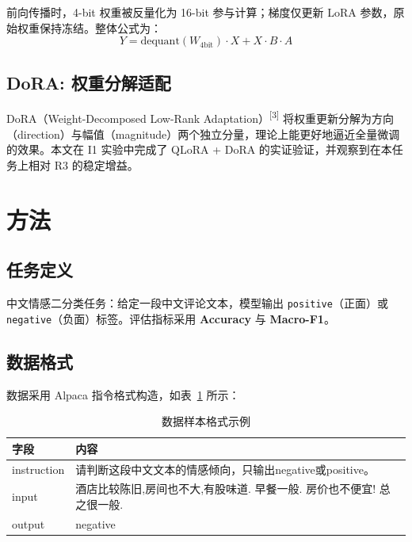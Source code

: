 \documentclass[12pt,a4paper]{article}
\begin{document}
前向传播时，4-bit 权重被反量化为 16-bit 参与计算；梯度仅更新 LoRA 参数，原始权重保持冻结。整体公式为：
\begin{equation}
  Y = \text{dequant}(W_{\text{4bit}}) \cdot X + X \cdot B \cdot A
\end{equation}

\subsection{DoRA: 权重分解适配}

DoRA（Weight-Decomposed Low-Rank Adaptation）\textsuperscript{[3]} 将权重更新分解为方向（direction）与幅值（magnitude）两个独立分量，理论上能更好地逼近全量微调的效果。本文在 I1 实验中完成了 QLoRA + DoRA 的实证验证，并观察到在本任务上相对 R3 的稳定增益。

\section{方法}

\subsection{任务定义}

中文情感二分类任务：给定一段中文评论文本，模型输出 \texttt{positive}（正面）或 \texttt{negative}（负面）标签。评估指标采用 \textbf{Accuracy} 与 \textbf{Macro-F1}。

\subsection{数据格式}

数据采用 Alpaca 指令格式构造，如表~\ref{tab:data_format} 所示：

\begin{table}[H]
\centering
\caption{数据样本格式示例}
\label{tab:data_format}
\begin{tabularx}{\textwidth}{lX}
\toprule
\textbf{字段} & \textbf{内容} \\
\midrule
instruction & 请判断这段中文文本的情感倾向，只输出negative或positive。 \\
input & 酒店比较陈旧,房间也不大,有股味道. 早餐一般. 房价也不便宜! 总之很一般. \\
output & negative \\
\bottomrule
\end{tabularx}
\end{table}
\end{document}
